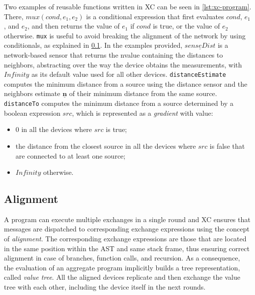 Two examples of reusable functions written in \ac{XC} can be seen in \cref{lst:xc-program}.
%
There, $mux(cond, e_1, e_2)$ is a conditional expression that first evaluates $cond$, $e_1$, and $e_2$, and then returns the value of $e_1$ if $cond$ is true, or the value of $e_2$ otherwise.
%
\texttt{mux} is useful to avoid breaking the alignment of the network by using conditionals, as explained in \cref{chap:background->sec:xc->subsec:alignment}.
%
In the examples provided, $\underline{senseDist}$ is a network-based sensor that returns the nvalue containing the distances to neighbors, abstracting over the way the device obtains the measurements, with $Infinity$ as its default value used for all other devices.
%
\texttt{distanceEstimate} computes the minimum distance from a source using the distance sensor and the neighbors estimate $\underline{\mathbf{n}}$ of their minimum distance from the same source.
%
\texttt{distanceTo} computes the minimum distance from a source determined by a boolean expression $src$, which is represented as a \textit{gradient} with value:
\begin{itemize}
    \item $0$ in all the devices where $src$ is true;
    \item the distance from the closest source in all the devices where $src$ is false that are connected to at least one source;
    \item $Infinity$ otherwise.
\end{itemize}



\subsection{Alignment}\label{chap:background->sec:xc->subsec:alignment}

A program can execute multiple exchanges in a single round and \ac{XC} ensures that messages are dispatched to corresponding exchange expressions using the concept of \textit{alignment}.
%
The corresponding exchange expressions are those that are located in the same position within the \ac{AST} and same stack frame, thus ensuring correct alignment in case of branches, function calls, and recursion\cite{xc}.
%
As a consequence, the evaluation of an aggregate program implicitly builds a tree representation, called \textit{value tree}.
%
All the aligned devices replicate and then exchange the value tree with each other, including the device itself in the next rounds.

